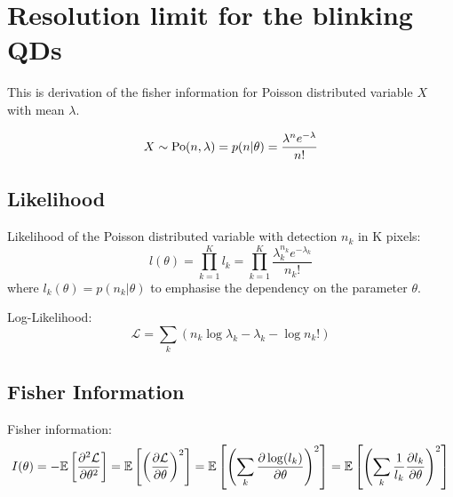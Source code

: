 \chapter{Resolution limit for the blinking QDs\label{app:Resolution limit for the blinking QDs}}


This is derivation of the fisher information for Poisson distributed
variable $X$ with mean $\lambda$.

\begin{equation}
X\sim\mathrm{Po}(n,\lambda)=p(n|\theta)=\frac{\lambda^{n}e^{-\lambda}}{n!}
\end{equation}



\section{Likelihood}

Likelihood of the Poisson distributed variable with detection $n_k$ in K pixels: 
%
\begin{equation}
	l(\theta)=\prod_{k=1}^{K}l_k=\prod_{k=1}^{K}\frac{\lambda_k^{n_k}e^{-\lambda_k}}{n_k!}\label{eq:Likelihood of Poisson}
\end{equation}
%
where $l_k(\theta)=p(n_k|\theta)$ to emphasise the dependency on the parameter $\theta$.

Log-Likelihood:
\begin{equation}
	\mathcal{L}=\sum_k\left(n_k\log\lambda_k-\lambda_k-\log n_k!\right)
\end{equation}


\section{Fisher Information}

Fisher information:
\begin{equation}
	I(\theta)=-\mathbb{E}\left[\frac{\partial^2\mathcal{L}}{\partial\theta^2}\right]=\mathbb{E}\left[\left(\frac{\partial\mathcal{L}}{\partial\theta}\right)^2\right]=\mathbb{E}\left[\left(\sum_k\frac{\partial\log(l_k)}{\partial\theta}\right)^2\right]=\mathbb{E}\left[\left(\sum_k\frac{1}{l_k}\frac{\partial l_k}{\partial\theta}\right)^2\right]\label{eq:Fisher Info Definition}
\end{equation}



